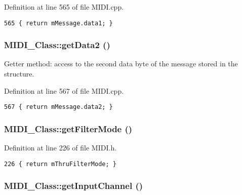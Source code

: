 Definition at line 565 of file MIDI.cpp.

\begin{Code}\begin{verbatim}565 { return mMessage.data1; }
\end{verbatim}
\end{Code}


\hypertarget{class_m_i_d_i___class_688f4f57142f1a7dfd1a79bf43e1b74d}{
\subsubsection[{getData2}]{ MIDI\_\-Class::getData2 ()}}
\label{class_m_i_d_i___class_688f4f57142f1a7dfd1a79bf43e1b74d}


Getter method: access to the second data byte of the message stored in the structure. 

Definition at line 567 of file MIDI.cpp.

\begin{Code}\begin{verbatim}567 { return mMessage.data2; }
\end{verbatim}
\end{Code}


\hypertarget{class_m_i_d_i___class_8952fc757cefe98856ba7cfc811bbbb3}{
\subsubsection[{getFilterMode}]{ MIDI\_\-Class::getFilterMode ()}}
\label{class_m_i_d_i___class_8952fc757cefe98856ba7cfc811bbbb3}




Definition at line 226 of file MIDI.h.

\begin{Code}\begin{verbatim}226 { return mThruFilterMode; }
\end{verbatim}
\end{Code}


\hypertarget{class_m_i_d_i___class_f05fb3c0857d2f50d6c21414eb18ef53}{
\subsubsection[{getInputChannel}]{ MIDI\_\-Class::getInputChannel ()}}
\label{class_m_i_d_i___class_f05fb3c0857d2f50d6c21414eb18ef53}




